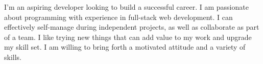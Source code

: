 

\begin{cvparagraph}

I'm an aspiring developer looking to build a successful career. I am passionate about programming with experience in full-stack web development. I can effectively self-manage during independent projects, as well as collaborate as part of a team. I like trying new things that can add value to my work and upgrade my skill set. I am willing to bring forth a motivated attitude and a variety of skills.
\end{cvparagraph}